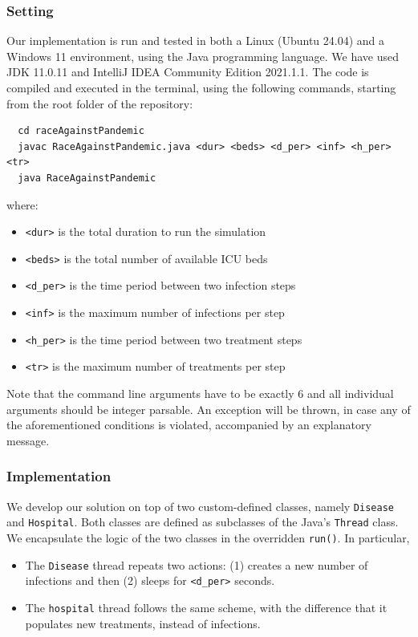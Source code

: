 \documentclass[acmlarge]{acmart}
\begin{document}
\subsubsection{Setting}
Our implementation is run and tested in both a Linux (Ubuntu 24.04) and a Windows 11 environment, using the Java programming language. We have used JDK 11.0.11 and IntelliJ IDEA Community Edition 2021.1.1. The code is compiled and executed in the terminal, using the following commands, starting from the root folder of the repository:

\begin{verbatim}
  cd raceAgainstPandemic
  javac RaceAgainstPandemic.java <dur> <beds> <d_per> <inf> <h_per> <tr>
  java RaceAgainstPandemic
\end{verbatim}
where:
\begin{itemize}
  \item \texttt{<dur>} is the total duration to run the simulation
  \item \texttt{<beds>} is the total number of available ICU beds
  \item \texttt{<d\_per>} is the time period between two infection steps
  \item \texttt{<inf>} is the maximum number of infections per step
  \item \texttt{<h\_per>} is the time period between two treatment steps
  \item \texttt{<tr>} is the maximum number of treatments per step
\end{itemize}
Note that the command line arguments have to be exactly 6 and all individual arguments should be integer parsable. An exception will be thrown, in case any of the aforementioned conditions is violated, accompanied by an explanatory message.

\subsubsection{Implementation}
We develop our solution on top of two custom-defined classes, namely \texttt{Disease} and \texttt{Hospital}. Both classes are defined as subclasses of the Java's \texttt{Thread} class. We encapsulate the logic of the two classes in the overridden \texttt{run()}. In particular,
\begin{itemize}
  \item The \texttt{Disease} thread repeats two actions: (1) creates a new number of infections and then (2) sleeps for \texttt{<d\_per>} seconds.
  \item The \texttt{hospital} thread follows the same scheme, with the difference that it populates new treatments, instead of infections.
\end{itemize}
\end{document}
